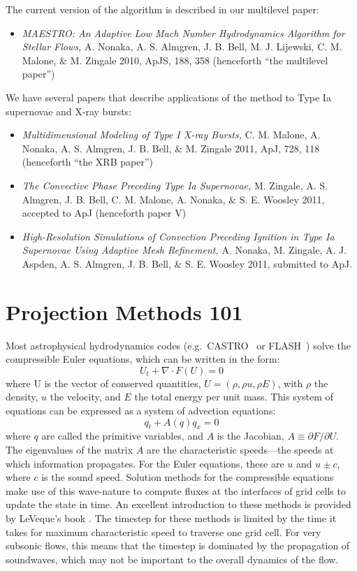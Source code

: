 \noindent The current version of the algorithm is described in our
multilevel paper:
\begin{itemize}
\item {\em MAESTRO: An Adaptive Low Mach Number Hydrodynamics Algorithm for Stellar
  Flows,} A. Nonaka, A. S. Almgren, J. B. Bell, M. J. Lijewski, C. M. Malone,
  \& M. Zingale 2010, ApJS, 188, 358 (henceforth ``the multilevel paper'')
\end{itemize}

\noindent We have several papers that describe applications of the
method to Type Ia supernovae and X-ray bursts:
\begin{itemize}
\item {\em Multidimensional Modeling of Type I X-ray Bursts,}
  C. M. Malone, A. Nonaka, A. S. Almgren, J. B. Bell, \& M. Zingale 2011,
  ApJ, 728, 118 (henceforth ``the XRB paper'')
\item {\em The Convective Phase Preceding Type Ia Supernovae,}
  M. Zingale, A. S. Almgren, J. B. Bell, C. M. Malone, A. Nonaka, \& S. E. Woosley 2011,
  accepted to ApJ (henceforth paper V)
\item {\em High-Resolution Simulations of Convection Preceding Ignition in
  Type Ia Supernovae Using Adaptive Mesh Refinement,}
  A. Nonaka, M. Zingale, A. J. Aspden, A. S. Almgren, J. B. Bell, \& S. E. Woosley 2011, submitted to ApJ.
\end{itemize}


\section{Projection Methods 101}

Most astrophysical hydrodynamics codes
(e.g.\ CASTRO~\cite{castro} or FLASH~\cite{flash}) solve the
compressible Euler equations, which can be written in the form:
\begin{equation}
U_t + \nabla \cdot F(U) = 0
\end{equation}
where U is the vector of conserved quantities, $U = (\rho, \rho u,
\rho E)$, with $\rho$ the density, $u$ the velocity, and $E$ the total
energy per unit mass.  This system of equations can be expressed 
as a system of advection equations:
\begin{equation}
q_t + A(q) q_x = 0
\end{equation}
where $q$ are called the primitive variables, and $A$ is the
Jacobian, $A \equiv \partial F / \partial U$.  The eigenvalues of the
matrix $A$ are the characteristic speeds---the speeds at which
information propagates.  For the Euler equations, these are $u$ and $u
\pm c$, where $c$ is the sound speed.  Solution methods for the
compressible equations make use of this wave-nature to compute fluxes
at the interfaces of grid cells to update the state in time.  An
excellent introduction to these methods is provided by LeVeque's book
\cite{leveque}.  The timestep for these methods is limited by the time
it takes for maximum characteristic speed to traverse one grid cell.
For very subsonic flows, this means that the timestep is dominated by
the propagation of soundwaves, which may not be important to the
overall dynamics of the flow.


